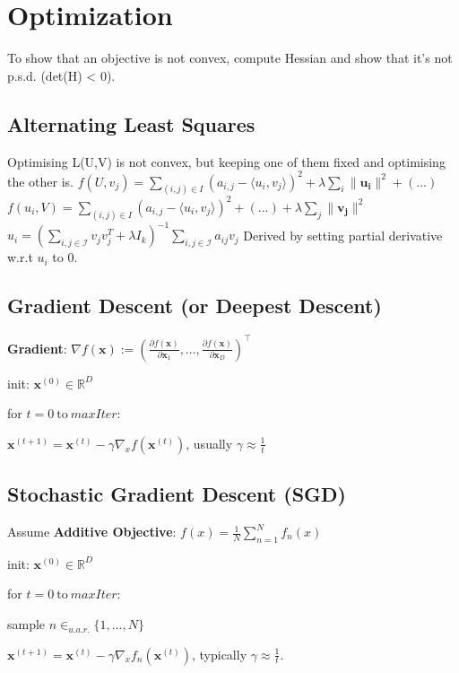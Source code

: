 \section{Optimization}
To show that an objective is not convex, compute Hessian and show that it's not p.s.d. (det(H) < 0).

\subsection*{Alternating Least Squares}
Optimising L(U,V) is not convex, but keeping one of them fixed and optimising the other is.
$f(U,v_j)=\sum_{(i,j)\in I} (a_{i,j} - \langle u_i, v_j \rangle)^2 + \lambda \sum_i \lVert\mathbf{u_i}\rVert^2 +(...)$\\
$f(u_i,V)=\sum_{(i,j)\in I} (a_{i,j} - \langle u_i, v_j \rangle)^2 + (...) + \lambda \sum_j \lVert\mathbf{v_j}\rVert^2$\\
$u_i = (\sum_{i,j \in \mathcal{I}} v_jv_j^T + \lambda I_k)^{-1} \sum_{i,j \in \mathcal{I}} a_{ij}v_j$
Derived by setting partial derivative w.r.t $u_i$ to 0.

\subsection*{Gradient Descent (or Deepest Descent)}
\textbf{Gradient}: $\nabla f(\mathbf{x}) := \left( \frac{\partial f(\mathbf{x})}{\partial \mathbf{x}_1}, \ldots, \frac{\partial f(\mathbf{x})}{\partial \mathbf{x}_D} \right)^\top$

\begin{inparaenum}
	\item init: $\mathbf{x}^{(0)} \in \mathbb{R}^D$
	\item for $t = 0 \ \text{to} \ \mathit{maxIter}$:
	\item $\mathbf{x}^{(t+1)} = \mathbf{x}^{(t)} - \gamma \nabla_x f(\mathbf{x}^{(t)})$, usually $\gamma \approx \frac{1}{t}$
\end{inparaenum}

\subsection*{Stochastic Gradient Descent (SGD)}
Assume \textbf{Additive Objective}: $f(x) = \frac{1}{N}\sum_{n=1}^{N}f_n(x)$\\

\begin{inparaenum}
	\item init: $\mathbf{x}^{(0)} \in \mathbb{R}^D$
	\item for $t = 0 \ \text{to} \ \mathit{maxIter}$:
	\item sample $n \in_{u.a.r.} \{1, \ldots, N\}$
	\item $\mathbf{x}^{(t+1)} = \mathbf{x}^{(t)} - \gamma \nabla_x f_n(\mathbf{x}^{(t)})$, typically  $\gamma \approx \frac{1}{t}$.
\end{inparaenum}

